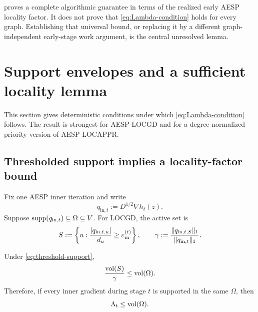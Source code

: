 \begin{remark}
 proves a complete algorithmic guarantee in terms of the
realized early AESP locality factor.  It does not prove that
\cref{eq:Lambda-condition} holds for every graph.  Establishing that universal
bound, or replacing it by a different graph-independent early-stage work
argument, is the central unresolved lemma.
\end{remark}

\section{Support envelopes and a sufficient locality lemma}
\label{sec:support-envelope}

This section gives deterministic conditions under which
\cref{eq:Lambda-condition} follows.  The result is strongest for AESP-LOCGD
and for a degree-normalized priority version of AESP-LOCAPPR.

\subsection{Thresholded support implies a locality-factor bound}

Fix one AESP inner iteration and write
\begin{equation}
  q_{\mathrm{in},t}:=D^{1/2}\nabla h_t(z).
  \label{eq:q-inner-short}
\end{equation}
Suppose $\operatorname{supp}(q_{\mathrm{in},t})\subseteq\Omega\subseteq V$.  For LOCGD, the
active set is
\begin{equation}
  S:=\left\{u:\frac{\left\lvert q_{\mathrm{in},t,u} \right\rvert}{d_u}
      \geq\varepsilon_{\mathrm{in}}^{(t)}\right\},
  \qquad
  \gamma:=\frac{\lVert q_{\mathrm{in},t,S}\rVert_1}
                 {\lVert q_{\mathrm{in},t}\rVert_1}.
  \label{eq:threshold-support}
\end{equation}

\begin{lemma}
\label{lem:support-envelope}
Under \cref{eq:threshold-support},
\begin{equation}
  \frac{\operatorname{vol}(S)}{\gamma}\leq\operatorname{vol}(\Omega).
  \label{eq:support-envelope-bound}
\end{equation}
Therefore, if every inner gradient during stage $t$ is supported in the same
$\Omega$, then
\begin{equation}
  \Lambda_t\leq\operatorname{vol}(\Omega).
  \label{eq:Lambda-envelope}
\end{equation}
\end{lemma}

